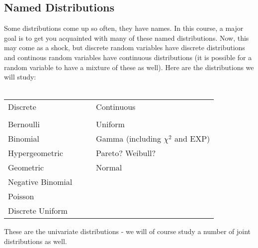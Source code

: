 \documentclass[12pt]{article} %
\begin{document}
\subsection{Named Distributions}
Some distributions come up so often, they have names. In this course, a major goal is to get you acquainted with many of these named distributions. Now, this may come as a shock, but discrete random variables have discrete distributions and continous random variables have continuous distributions (it is possible for a random variable to have a mixture of these as well). Here are the distributions we will study:\\\\

\begin{center}
\begin{tabular}{ l c c l }	

Discrete&&\hspace{6 in}& Continuous\\\\

Bernoulli &&& Uniform\\
Binomial &&& Gamma (including $\chi^2$ and EXP)\\
Hypergeometric &&& Pareto? Weibull?\\
Geometric &&& Normal\\
Negative Binomial&&&\\
Poisson&&&\\
Discrete Uniform
\end{tabular}
\end{center}
These are the univariate distributions - we will of course study a number of joint distributions as well.\\\\
\end{document}
